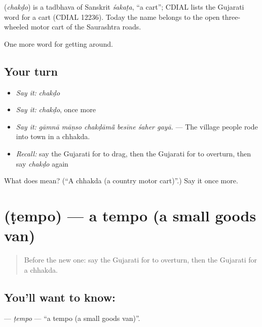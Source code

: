 \begin{cousinweb}
\textbf{} (\emph{chakḍo}) is a tadbhava of Sanskrit \emph{śakaṭa}, \textquotedblleft{}a cart\textquotedblright{}; CDIAL lists the Gujarati word for a cart (CDIAL 12236). Today the name belongs to the open three-wheeled motor cart of the Saurashtra roads.
\end{cousinweb}

\begin{grammarlens}[title={What you've built}]
One more word for getting around.
\end{grammarlens}

\subsection*{Your turn}
\begin{itemize}
\raggedright
  \item \emph{Say it:} \emph{chakḍo}
  \item \emph{Say it:} \emph{chakḍo}, once more
  \item \emph{Say it:} \emph{gāmnā māṇso chakḍāmā̃ besīne śaher gayā.} — The village people rode into town in a chhakda.
  \item \emph{Recall:} say the Gujarati for to drag, then the Gujarati for to overturn, then say \emph{chakḍo} again
\end{itemize}

\begin{tcolorbox}[breakable,colback=teal!4,colframe=teal!35!black,title={Before you move on}]
What does  mean? (\textquotedblleft{}A chhakda (a country motor cart)\textquotedblright{}.) Say it once more.
\end{tcolorbox}
\section[\texorpdfstring{\gu{ટેમ્પો} (ṭempo)}{ટેમ્પો (ṭempo)}]{ (ṭempo) — a tempo (a small goods van)}

\label{lesson:GU-C402-tempo}



\begin{quote}
Before the new one: say the Gujarati for to overturn, then the Gujarati for a chhakda.
\end{quote}

\subsection*{You'll want to know: }
\textbf{} — \emph{ṭempo} — \textquotedblleft{}a tempo (a small goods van)\textquotedblright{}.

